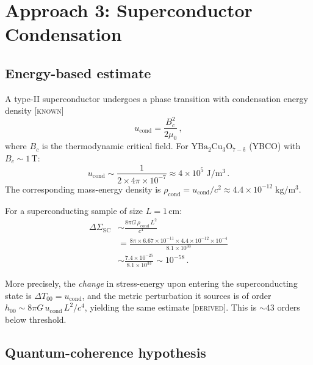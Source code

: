 \documentclass[prd,twocolumn,superscriptaddress,longbibliography,floatfix]{revtex4-2}
\newcommand{\DSigma}{\Delta\Sigma}
\newcommand{\known}{\textsc{[known]}}
\newcommand{\derived}{\textsc{[derived]}}
\begin{document}
\section{Approach 3: Superconductor Condensation}
\label{sec:superconductor}

\subsection{Energy-based estimate}

A type-II superconductor undergoes a phase transition with condensation
energy density \known~\cite{Tinkham2004}
\begin{equation}
  u_{\mathrm{cond}} = \frac{B_c^2}{2\mu_0}\,,
  \label{eq:u-cond}
\end{equation}
where $B_c$ is the thermodynamic critical field.  For
$\mathrm{YBa_2Cu_3O_{7-\delta}}$ (YBCO) with
$B_c \sim 1\,\mathrm{T}$:
\begin{equation}
  u_{\mathrm{cond}} \sim \frac{1}{2 \times 4\pi \times 10^{-7}}
  \approx 4 \times 10^5\;\mathrm{J/m^3}\,.
  \label{eq:u-cond-num}
\end{equation}
The corresponding mass-energy density is
$\rho_{\mathrm{cond}} = u_{\mathrm{cond}}/c^2
\approx 4.4 \times 10^{-12}\;\mathrm{kg/m^3}$.

For a superconducting sample of size $L = 1\,\mathrm{cm}$:
\begin{align}
  \DSigma_{\mathrm{SC}} &\sim \frac{8\pi G\,\rho_{\mathrm{cond}}\,L^2}{c^4}
  \nonumber \\
  &= \frac{8\pi \times 6.67 \times 10^{-11} \times 4.4 \times 10^{-12}
  \times 10^{-4}}{8.1 \times 10^{33}}
  \nonumber \\
  &\sim \frac{7.4 \times 10^{-25}}{8.1 \times 10^{33}}
  \sim 10^{-58}\,.
  \label{eq:dsigma-sc-energy}
\end{align}

\noindent More precisely, the \emph{change} in stress-energy upon
entering the superconducting state is $\Delta T_{00} = u_{\mathrm{cond}}$,
and the metric perturbation it sources is of order
$h_{00} \sim 8\pi G\,u_{\mathrm{cond}}\,L^2/c^4$, yielding the same
estimate \derived.  This is $\sim 43$ orders below threshold.

\subsection{Quantum-coherence hypothesis}
\label{subsec:coherence}
\end{document}
